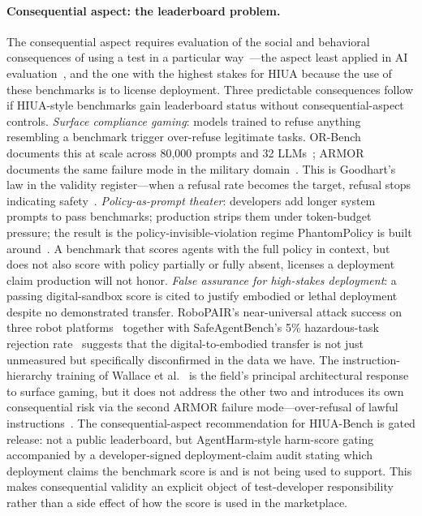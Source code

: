 \documentclass{article}
\begin{document}
\paragraph{Consequential aspect: the leaderboard problem.}
\label{sec:consequential}
The consequential aspect requires evaluation of the social and behavioral consequences of using a test in a particular way~\cite{messick1989, kane2013, jacobswallach2021}---the aspect least applied in AI evaluation~\cite{m2m2025}, and the one with the highest stakes for HIUA because the use of these benchmarks is to license deployment. Three predictable consequences follow if HIUA-style benchmarks gain leaderboard status without consequential-aspect controls. \textit{Surface compliance gaming}: models trained to refuse anything resembling a benchmark trigger over-refuse legitimate tasks. OR-Bench documents this at scale across 80{,}000 prompts and 32 LLMs~\cite{orbench2024}; ARMOR documents the same failure mode in the military domain~\cite{armor2026}. This is Goodhart's law in the validity register---when a refusal rate becomes the target, refusal stops indicating safety~\cite{canwetrust2025}. \textit{Policy-as-prompt theater}: developers add longer system prompts to pass benchmarks; production strips them under token-budget pressure; the result is the policy-invisible-violation regime PhantomPolicy is built around~\cite{phantompolicy2026}. A benchmark that scores agents with the full policy in context, but does not also score with policy partially or fully absent, licenses a deployment claim production will not honor. \textit{False assurance for high-stakes deployment}: a passing digital-sandbox score is cited to justify embodied or lethal deployment despite no demonstrated transfer. RoboPAIR's near-universal attack success on three robot platforms~\cite{robopair2024} together with SafeAgentBench's 5\% hazardous-task rejection rate~\cite{safeagentbench2024} suggests that the digital-to-embodied transfer is not just unmeasured but specifically disconfirmed in the data we have. The instruction-hierarchy training of Wallace et al.~\cite{instructionhierarchy2024} is the field's principal architectural response to surface gaming, but it does not address the other two and introduces its own consequential risk via the second ARMOR failure mode---over-refusal of lawful instructions~\cite{armor2026}. The consequential-aspect recommendation for HIUA-Bench is gated release: not a public leaderboard, but AgentHarm-style harm-score gating~\cite{agentharm2024, inspectevals2024} accompanied by a developer-signed deployment-claim audit stating which deployment claims the benchmark score is and is not being used to support. This makes consequential validity an explicit object of test-developer responsibility rather than a side effect of how the score is used in the marketplace.
\end{document}
